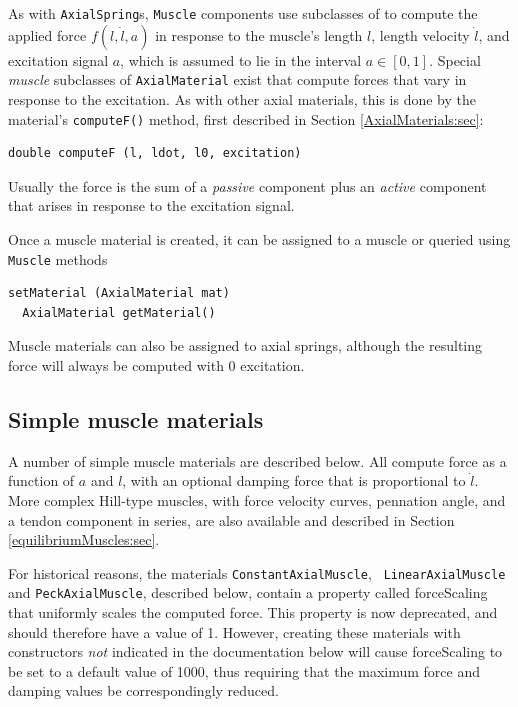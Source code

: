 As with {\tt AxialSpring}s, {\tt Muscle} components use subclasses of
 to compute the
applied force $f (l, \dot l, a)$ in response to the muscle's length
$l$, length velocity $\dot l$, and excitation signal $a$, which is
assumed to lie in the interval $a \in [0,1]$. Special {\it muscle}
subclasses of {\tt AxialMaterial} exist that compute forces that vary
in response to the excitation. As with other axial materials, this is
done by the material's {\tt computeF()} method, first described in
Section \ref{AxialMaterials:sec}:
%
\begin{lstlisting}[]
  double computeF (l, ldot, l0, excitation)
\end{lstlisting}
%
Usually the force is the sum of a {\it passive} component plus an {\it
active} component that arises in response to the excitation signal.

Once a muscle material is created, it can be assigned to a muscle
or queried using {\tt Muscle} methods
\begin{lstlisting}[]
  setMaterial (AxialMaterial mat)
  AxialMaterial getMaterial()
\end{lstlisting}
%

\begin{sideblock}
Muscle materials can also be assigned to axial springs, although the
resulting force will always be computed with 0 excitation.
\end{sideblock}

\subsection{Simple muscle materials}
\label{sec:mechii:musclematerials}

A number of simple muscle materials are described below. All compute
force as a function of $a$ and $l$, with an optional damping force
that is proportional to $\dot l$. More complex Hill-type muscles, with
force velocity curves, pennation angle, and a tendon component in
series, are also available and described in
Section \ref{equilibriumMuscles:sec}.

\begin{sideblock}
For historical reasons, the materials {\tt ConstantAxialMuscle}, {\tt
LinearAxialMuscle} and {\tt PeckAxialMuscle}, described below, contain
a property called {\sf forceScaling} that uniformly scales the
computed force. This property is now deprecated, and should therefore
have a value of 1. However, creating these materials with constructors
{\it not} indicated in the documentation below will cause {\sf
forceScaling} to be set to a default value of 1000, thus requiring
that the maximum force and damping values be correspondingly reduced.
\end{sideblock}

